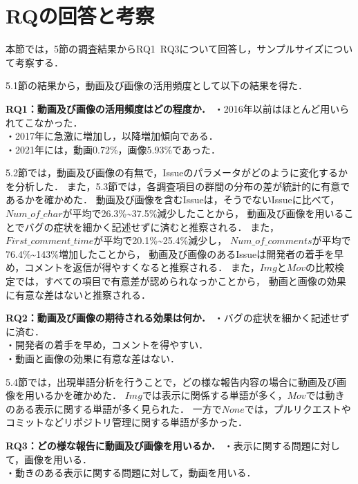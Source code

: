 \section{RQの回答と考察\label{research}}

本節では，5節の調査結果からRQ1~RQ3について回答し，サンプルサイズについて考察する．

5.1節の結果から，動画及び画像の活用頻度として以下の結果を得た．
\begin{itembox}{\textbf{RQ1：動画及び画像の活用頻度はどの程度か．}}
  ・2016年以前はほとんど用いられてこなかった．\\
  ・2017年に急激に増加し，以降増加傾向である．\\
  ・2021年には，動画0.72\%，画像5.93\%であった．
\end{itembox}

5.2節では，動画及び画像の有無で，Issueのパラメータがどのように変化するかを分析した．
また，5.3節では，各調査項目の群間の分布の差が統計的に有意であるかを確かめた．
動画及び画像を含むIssueは，そうでないIssueに比べて，
$Num\_of\_char$が平均で26.3\%\textasciitilde 37.5\%減少したことから，
動画及び画像を用いることでバグの症状を細かく記述せずに済むと推察される．
また，$First\_comment\_time$が平均で20.1\%\textasciitilde25.4\%減少し，
$Num\_of\_comments$が平均で76.4\%\textasciitilde143\%増加したことから，
動画及び画像のあるIssueは開発者の着手を早め，コメントを返信が得やすくなると推察される．
また，$Img$と$Mov$の比較検定では，すべての項目で有意差が認められなっかことから，
動画と画像の効果に有意な差はないと推察される．
\begin{itembox}{\textbf{RQ2：動画及び画像の期待される効果は何か．}}
  ・バグの症状を細かく記述せずに済む．\\
  ・開発者の着手を早め，コメントを得やすい．\\
  ・動画と画像の効果に有意な差はない．
\end{itembox}

5.4節では，出現単語分析を行うことで，どの様な報告内容の場合に動画及び画像を用いるかを確かめた．
$Img$では表示に関係する単語が多く，$Mov$では動きのある表示に関する単語が多く見られた．
一方で$None$では，プルリクエストやコミットなどリポジトリ管理に関する単語が多かった．

\begin{itembox}{\textbf{RQ3：どの様な報告に動画及び画像を用いるか．}}
  ・表示に関する問題に対して，画像を用いる．\\
  ・動きのある表示に関する問題に対して，動画を用いる．
\end{itembox}

